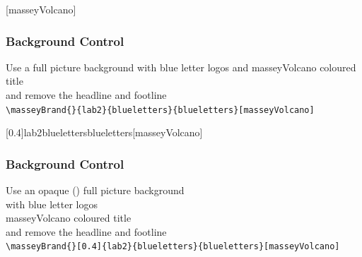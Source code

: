 \documentclass[10pt,aspectratio=169]{beamer}
\begin{document}
[masseyVolcano]

\begin{frame}
\frametitle{Background Control}
Use a full picture background with blue letter logos and masseyVolcano coloured title \\
and remove the headline and footline\\[2ex]
\verb|\masseyBrand{}{lab2}{blueletters}{blueletters}[masseyVolcano]|
\end{frame}

\masseyBrand{}[0.4]{lab2}{blueletters}{blueletters}[masseyVolcano]

\begin{frame}
\frametitle{Background Control}
\color{black}
Use an opaque (\backgroundfileopacity) full picture background \\with blue letter logos \\masseyVolcano coloured title \\
and remove the headline and footline\\[2ex]
\verb|\masseyBrand{}[0.4]{lab2}{blueletters}{blueletters}[masseyVolcano]|
\end{frame}




\begin{frame}[t]
\masseyTitlepage %

\raggedleft
\begin{mblock}[180pt]{0.7}{}
\raggedleft
\textbf{\insertauthor}\\
\insertdepartment\\
\insertinstitute\\
\insertcontact\\
\insertdate
\end{mblock}
\vfill
\end{frame}

\masseyBrand{}{}{}{}
\end{document}
